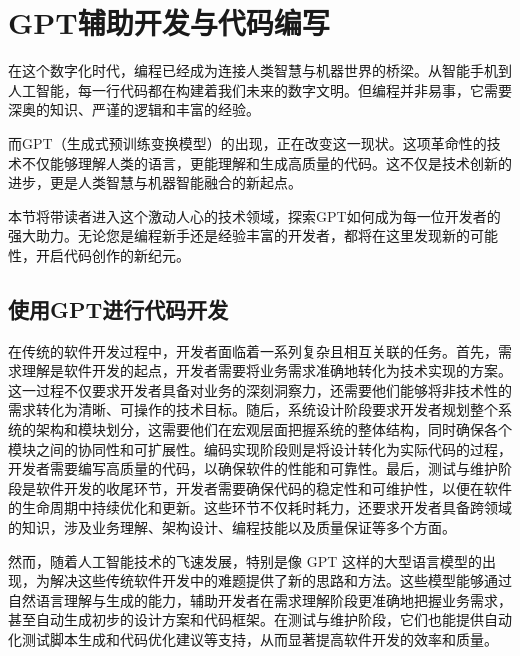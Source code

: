 \section{GPT辅助开发与代码编写}\label{sec:gpt-code}


在这个数字化时代，编程已经成为连接人类智慧与机器世界的桥梁。从智能手机到人工智能，每一行代码都在构建着我们未来的数字文明。但编程并非易事，它需要深奥的知识、严谨的逻辑和丰富的经验。

而GPT（生成式预训练变换模型）的出现，正在改变这一现状。这项革命性的技术不仅能够理解人类的语言，更能理解和生成高质量的代码。这不仅是技术创新的进步，更是人类智慧与机器智能融合的新起点。

本节将带读者进入这个激动人心的技术领域，探索GPT如何成为每一位开发者的强大助力。无论您是编程新手还是经验丰富的开发者，都将在这里发现新的可能性，开启代码创作的新纪元。

\subsection{使用GPT进行代码开发}\label{sec:gpt-dev}

在传统的软件开发过程中，开发者面临着一系列复杂且相互关联的任务。首先，需求理解是软件开发的起点，开发者需要将业务需求准确地转化为技术实现的方案。这一过程不仅要求开发者具备对业务的深刻洞察力，还需要他们能够将非技术性的需求转化为清晰、可操作的技术目标。随后，系统设计阶段要求开发者规划整个系统的架构和模块划分，这需要他们在宏观层面把握系统的整体结构，同时确保各个模块之间的协同性和可扩展性。编码实现阶段则是将设计转化为实际代码的过程，开发者需要编写高质量的代码，以确保软件的性能和可靠性。最后，测试与维护阶段是软件开发的收尾环节，开发者需要确保代码的稳定性和可维护性，以便在软件的生命周期中持续优化和更新。这些环节不仅耗时耗力，还要求开发者具备跨领域的知识，涉及业务理解、架构设计、编程技能以及质量保证等多个方面。

然而，随着人工智能技术的飞速发展，特别是像 GPT 这样的大型语言模型的出现，为解决这些传统软件开发中的难题提供了新的思路和方法。这些模型能够通过自然语言理解与生成的能力，辅助开发者在需求理解阶段更准确地把握业务需求，甚至自动生成初步的设计方案和代码框架。在测试与维护阶段，它们也能提供自动化测试脚本生成和代码优化建议等支持，从而显著提高软件开发的效率和质量。

